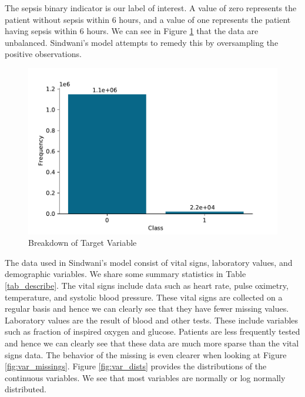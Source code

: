 \documentclass[10pt,letterpaper]{article}
\begin{document}

\par The sepsis binary indicator is our label of interest. A value of zero represents the patient without sepsis within 6 hours, and a value of one represents the patient having sepsis within 6 hours. We can see in Figure \ref{fig:label_dist} that the data are unbalanced. Sindwani's model attempts to remedy this by oversampling the positive observations.

\begin{figure}[htbp!]
    \centering
    \includegraphics[scale = 0.7]{Label_dist.pdf}
    \caption{Breakdown of Target Variable}
    \label{fig:label_dist}
\end{figure}

\par The data used in Sindwani's model consist of vital signs, laboratory values, and demographic variables. We share some summary statistics in Table \ref{tab_describe}. The vital signs include data such as heart rate, pulse oximetry, temperature, and systolic blood pressure. These vital signs are collected on a regular basis and hence we can clearly see that they have fewer missing values. Laboratory values are the result of blood and other tests. These include variables such as fraction of inspired oxygen and glucose. Patients are less frequently tested and hence we can clearly see that these data are much more sparse than the vital signs data. The behavior of the missing is even clearer when looking at Figure \ref{fig:var_missings}. Figure \ref{fig:var_dists} provides the distributions of the continuous variables. We see that most variables are normally or log normally distributed. 
\end{document}
